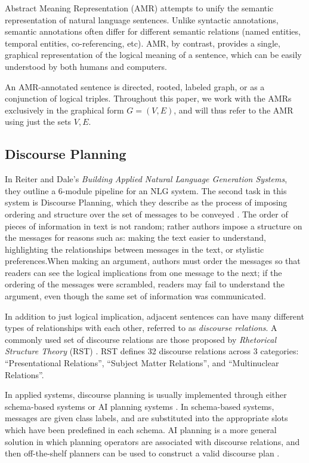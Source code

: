 \documentclass[12pt]{article}
\begin{document}
Abstract Meaning Representation (AMR)\cite{amr_sembank} attempts to unify the
semantic representation of natural language sentences. Unlike syntactic
annotations, semantic annotations often differ for different semantic relations
(named entities, temporal entities, co-referencing, etc). AMR, by contrast,
provides a single, graphical representation of the logical meaning of a
sentence, which can be easily understood by both humans and computers.

An AMR-annotated sentence is directed, rooted, labeled graph, or as a
conjunction of logical triples. Throughout this paper, we work with the AMRs
exclusively in the graphical form $G=(V,E)$, and will thus refer to the AMR
using just the sets $V,E$.

\subsection{Discourse Planning}

In Reiter and Dale's {\em Building Applied Natural Language Generation Systems}, they outline a 6-module pipeline for an NLG system. The second task in this system is Discourse Planning, which they describe as the process of imposing ordering and structure over the set of messages to be conveyed \cite{applied_nlg}. The order of pieces of information in text is not random; rather authors impose a structure on the messages for reasons such as: making the text easier to understand, highlighting the relationships between messages in the text, or stylistic preferences.When making an argument, authors must order the messages so that readers can see the logical implications from one message to the next; if the ordering of the messages were scrambled, readers may fail to understand the argument, even though the same set of information was communicated.

In addition to just logical implication, adjacent sentences can have many different types of relationships with each other, referred to as {\em discourse relations}. A commonly used set of discourse relations are those proposed by {\em Rhetorical Structure Theory} (RST) \cite{rst}. RST defines 32 discourse relations across 3 categories: ``Presentational Relations'', ``Subject Matter Relations'', and ``Multinuclear Relations''.

In applied systems, discourse planning is usually implemented through either schema-based systems or AI planning systems \cite{applied_nlg}. In schema-based systems, messages are given class labels, and are substituted into the appropriate slots which have been predefined in each schema. AI planning is a more general solution in which planning operators are associated with discourse relations, and then off-the-shelf planners can be used to construct a valid discourse plan \cite{hovy1993automated}\cite{paris1990natural}.
\end{document}
